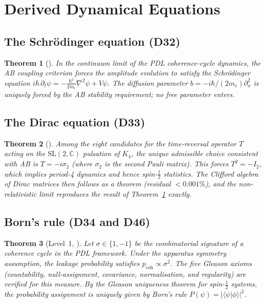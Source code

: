 \documentclass[11pt,a4paper]{article}
\theoremstyle{plain}
\newtheorem{theorem}{Theorem}[section]
\theoremstyle{definition}
\theoremstyle{remark}
\begin{document}
\section{Derived Dynamical Equations}
\label{sec:dynamics}

\subsection{The Schr\"odinger equation (D32)}
\label{subsec:schrodinger}
\begin{theorem}[\cite{D32}]
\label{thm:Schrodinger}
In the continuum limit of the PDL coherence-cycle dynamics, the AB coupling criterion forces the amplitude evolution to satisfy the Schr\"odinger equation $i\hbar\,\partial_t\psi=-\frac{\hbar^2}{2m_e}\nabla^2\psi+V\psi$. The diffusion parameter $b=-i\hbar/(2m_e)\partial_x^2$ is uniquely forced by the AB stability requirement; no free parameter enters.
\end{theorem}

\subsection{The Dirac equation (D33)}
\label{subsec:dirac}
\begin{theorem}[\cite{D33}]
\label{thm:Dirac}
Among the eight candidates for the time-reversal operator $T$ acting on the $\mathrm{SL}(2,\mathbb{C})$ pulsation of $K_4$, the unique admissible choice consistent with AB is $T=-i\sigma_2$ (where $\sigma_2$ is the second Pauli matrix). This forces $T^2=-I_2$, which implies period-4 dynamics and hence spin-$\tfrac{1}{2}$ statistics. The Clifford algebra of Dirac matrices then follows as a theorem (residual $<0.001\%$), and the non-relativistic limit reproduces the result of Theorem~\ref{thm:Schrodinger} exactly.
\end{theorem}

\subsection{Born's rule (D34 and D46)}
\label{subsec:born}
\begin{theorem}[Level~1, \cite{D34}]
\label{thm:BornL1}
Let $\sigma\in\{1,-1\}$ be the combinatorial signature of a coherence cycle in the PDL framework. Under the apparatus symmetry assumption, the leakage probability satisfies $p_{\mathrm{coh}}\propto\sigma^2$. The five Gleason axioms (countability, null-assignment, covariance, normalisation, and regularity) are verified for this measure. By the Gleason uniqueness theorem for spin-$\tfrac{1}{2}$ systems, the probability assignment is uniquely given by Born's rule $P(\psi)=|\langle\psi|\phi\rangle|^2$.
\end{theorem}
\end{document}
